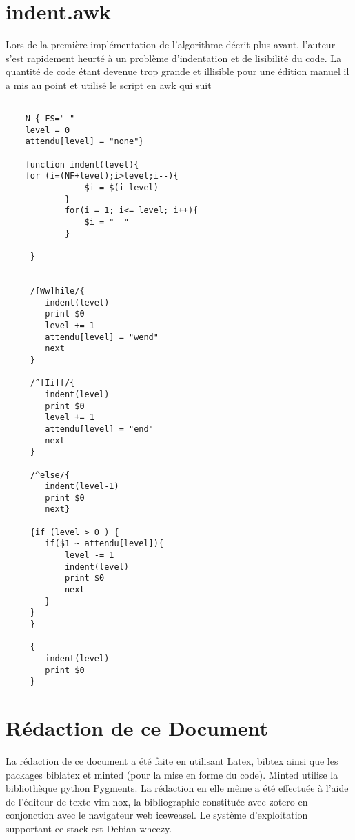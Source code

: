 \documentclass[11pt]{report}
\begin{document}
\section{indent.awk}
Lors de la première implémentation de l'algorithme décrit plus avant, l'auteur s'est rapidement heurté à un problème d'indentation et de lisibilité du code. La quantité de code étant devenue trop grande et illisible pour une édition manuel il a mis au point et utilisé le script en awk\cite{awk} qui suit
\begin{verbatim}

	N { FS=" " 
	level = 0
	attendu[level] = "none"}

	function indent(level){
	for (i=(NF+level);i>level;i--){
				$i = $(i-level)
			}
			for(i = 1; i<= level; i++){
				$i = "  "
			}

	 }


	 /[Ww]hile/{
		indent(level)
		print $0
		level += 1
		attendu[level] = "wend"
		next
	 }

	 /^[Ii]f/{
		indent(level)
		print $0
		level += 1
		attendu[level] = "end"
		next
	 }

	 /^else/{
		indent(level-1)
		print $0
		next}

	 {if (level > 0 ) {
		if($1 ~ attendu[level]){
			level -= 1
			indent(level)
			print $0
			next
		}
	 }
	 }

	 {
		indent(level)
		print $0
	 }
\end{verbatim}
\section{Rédaction de ce Document}
La rédaction de ce document a été faite en utilisant Latex\cite{latex}, bibtex\cite{bibtex} ainsi que les packages biblatex\cite{biblatex} et minted\cite{minted} (pour la mise en forme du code).
Minted utilise la bibliothèque python Pygments\cite{Pygments}. La rédaction en elle même a été effectuée à l'aide de l'éditeur de texte vim-nox\cite{vimnox}, la bibliographie constituée avec zotero\cite{zotero} en conjonction avec le navigateur web iceweasel\cite{iceweasel}. Le système d'exploitation supportant ce stack est Debian wheezy\cite{debian}.

\printbibliography
\end{document}
